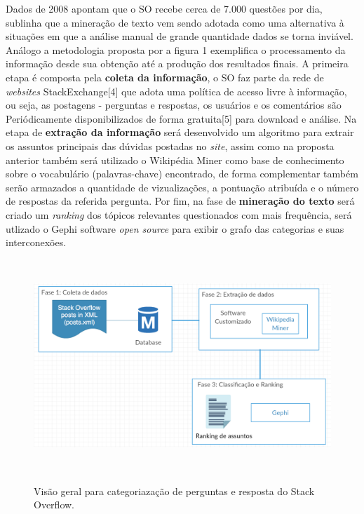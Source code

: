 \documentclass[10pt,a4paper,final]{article}
\begin{document}
Dados de 2008 apontam que o SO recebe cerca de 7.000 questões por dia, \cite{Krippendorff2012} sublinha que a mineração de texto vem sendo adotada como uma alternativa à situações em que a análise manual de grande quantidade dados se torna inviável. Análogo a metodologia proposta por \cite{Arash2016} a figura 1 exemplifica o processamento da informação desde sua obtenção até a produção dos resultados finais.
\newline
\newline
A primeira etapa é composta pela \textbf{coleta da informação}, o SO faz parte da rede de \textit{websites} StackExchange[4] que adota uma política de acesso livre à informação, ou seja, as postagens - perguntas e respostas, os usuários e os comentários são Periódicamente disponibilizados de forma gratuita[5] para download e análise.
\newline
\newline
Na etapa de \textbf{extração da informação} será desenvolvido um algoritmo para extrair os assuntos principais \cite{Turney:2000:LAK:593957.593993} das dúvidas postadas no \textit{site}, assim como na proposta anterior também será utilizado o Wikipédia Miner \cite{Milne2012} como base de conhecimento sobre o vocabulário (palavras-chave) encontrado, de forma complementar também serão armazados a quantidade de vizualizações, a pontuação atribuída e o número de respostas da referida pergunta.
\newline
\newline
Por fim, na fase de \textbf{mineração do texto} será criado um \textit{ranking} \cite{mihalcea-tarau:2004:EMNLP} dos tópicos relevantes questionados com mais frequência, será utlizado o Gephi \cite{ICWSM09154} software \textit{open source} para exibir o grafo das categorias e suas interconexões.

\begin{figure}[!htb]
\centering
\includegraphics[height=8cm]{Figures/figura_1_metodologia}
\label{fig:figura_1_metodologia}   
\caption{Visão geral para categoriazação de perguntas e resposta do Stack Overflow.}
\end{figure}
\end{document}
